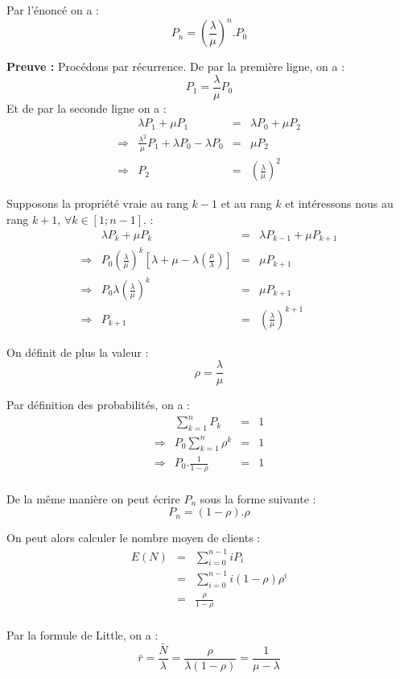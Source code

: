 \documentclass[a4paper, 11pt, fleqn]{article}
\newcommand{\inve}[1]{\frac{1}{#1}}
\begin{document}
Par l'énoncé on a : $$
P_n = \left ( \frac{\lambda}{\mu} \right )^n . P_0 $$

\textbf{Preuve :}
Procédons par récurrence.  De par la première ligne, on a : $$
P_1 = \frac{\lambda}{\mu} P_0 $$
Et de par la seconde ligne on a : $$
\begin{array}{rrcl}
	&\lambda P_1 + \mu P_1 &=& \lambda P_0 + \mu P_2 \\
	\Rightarrow & \frac{\lambda^2}{\mu} P_1 + \lambda P_0 - \lambda P_0 & = & \mu P_2 \\
	\Rightarrow & P_2 & = & \displaystyle \left ( \frac{\lambda}{\mu} \right )^2
\end{array} $$

Supposons la propriété vraie au rang $k-1$ et au rang $k$ et intéressons nous au rang $k+1$,
$\forall k \in [1;n-1]$. : $$
\begin{array}{rrcl}
	&\lambda P_k + \mu P_k &=& \lambda P_{k-1} + \mu P_{k+1} \\
	\Rightarrow & \displaystyle P_0 \left ( \frac{\lambda}{\mu} \right )^k \left [ \lambda + \mu -
\lambda \left ( \frac{\mu}{\lambda} \right ) \right ] &=& \mu P_{k+1} \\
	\Rightarrow & \displaystyle P_0 \lambda \left( \frac{\lambda}{\mu} \right )^k &=& \mu P_{k+1} \\
	\Rightarrow & P_{k+1} &=& \displaystyle\left (\frac{\lambda}{\mu} \right )^{k+1}
\end{array} $$


On définit de plus la valeur : $$
\rho = \frac{\lambda}{\mu} $$

Par définition des probabilités, on a : $$
\begin{array}{rlcl}
	&\displaystyle \sum_{k = 1}^n P_k & = & 1\\
	\Longrightarrow & P_0 \displaystyle \sum_{k = 1}^n \rho^k & = & 1 \\
	\Longrightarrow & P_0 . \displaystyle \inve{1 - \rho} & = & 1 \\
\end{array} $$

De la même manière on peut écrire $P_n$ sous la forme suivante : $$
P_n = (1-\rho) . \rho $$

On peut alors calculer le nombre moyen de clients : $$
\begin{array}{rcl}
	E(N) & = & \displaystyle \sum_{i=0}^{n-1} i P_i \\
			 	 & = & \displaystyle \sum_{i=0}^{n-1} i (1 - \rho) \rho^i \\
				 & = & \displaystyle \frac{\rho}{1 - \rho} \\
\end{array}$$

Par la formule de Little, on a : $$
\bar r = \frac{\bar N}{\lambda} = \frac{\rho}{\lambda (1 - \rho)} = \inve{\mu - \lambda} $$
\end{document}
